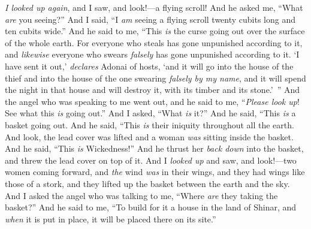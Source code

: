 \begin{biblechapter} %
 \textit{I looked up again}, and I saw, and look!—a flying scroll!
\verse And he asked me, “What \textit{are} you seeing?” And I said, “I \textit{am} seeing a flying scroll twenty cubits long and ten cubits wide.”
\verse And he said to me, “This \textit{is} the curse going out over the surface of the whole earth. For everyone who steals has gone unpunished according to it, and \textit{likewise} everyone who swears \textit{falsely} has gone unpunished according to it.
\verse ‘I have sent it out,’ \textit{declares} Adonai of hosts, ‘and it will go into the house of the thief and into the house of the one swearing \textit{falsely by my name}, and it will spend the night in that house and will destroy it, with its timber and its stone.’ ”
 And the angel who was speaking to me went out, and he said to me, “\textit{Please look up}! See what this \textit{is} going out.”
\verse And I asked, “What \textit{is} it?” And he said, “This \textit{is} a basket going out. And he said, “This \textit{is} their iniquity throughout all the earth.
\verse And look, the lead cover was lifted and a woman \textit{was} sitting inside the basket.
\verse And he said, “This \textit{is} Wickedness!” And he thrust her \textit{back down} into the basket, and threw the lead cover on top of it.
\verse And I \textit{looked up} and saw, and look!—two women coming forward, and \textit{the} wind \textit{was} in their wings, and they had wings like those of a stork, and they lifted up the basket between the earth and the sky.
\verse And I asked the angel who was talking to me, “Where \textit{are} they taking the basket?”
\verse And he said to me, “To build for it a house in the land of Shinar, and \textit{when} it is put in place, it will be placed there on its site.”
\end{biblechapter}

